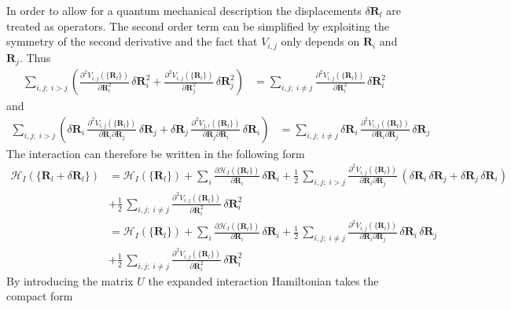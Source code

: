 In order to allow for a quantum mechanical description the displacements $\delta\mathbf{R}_l$ are treated as operators. The second order term can be simplified by exploiting the symmetry of the second derivative and the fact that $V_{i,j}$ only depends on $\mathbf{R}_i$ and $\mathbf{R}_j$. Thus
\begin{align*}
   \sum_{i,j;\;i> j}\left(\frac{\partial^2 V_{i,j}(\{\mathbf{R}_l\})}{\partial \mathbf{R}_i^2}\,\delta\mathbf{R}_i^2+\frac{\partial^2 V_{i,j}(\{\mathbf{R}_l\})}{\partial \mathbf{R}_j^2}\,\delta\mathbf{R}_j^2\right)&=\sum_{i,j;\;i\neq j}\frac{\partial^2 V_{i,j}(\{\mathbf{R}_l\})}{\partial \mathbf{R}_i^2}\,\delta\mathbf{R}_i^2
\end{align*}
and
\begin{align*}
    \sum_{i,j;\;i> j}\left(\delta\mathbf{R}_i\,\frac{\partial^2 V_{i,j}(\{\mathbf{R}_l\})}{\partial \mathbf{R}_i\partial\mathbf{R}_j}\,\delta\mathbf{R}_j + \delta\mathbf{R}_j\,\frac{\partial^2 V_{j,i}(\{\mathbf{R}_l\})}{\partial \mathbf{R}_j\partial\mathbf{R}_i}\,\delta\mathbf{R}_i\right)&= \sum_{i,j;\;i\neq j}\delta\mathbf{R}_i\,\frac{\partial^2 V_{i,j}(\{\mathbf{R}_l\})}{\partial \mathbf{R}_i\partial\mathbf{R}_j}\,\delta\mathbf{R}_j
\end{align*}
The interaction can therefore be written in the following form
\begin{align*}
    \mathcal{H}_I(\{\mathbf{R}_l+\delta\mathbf{R}_l\})&=\mathcal{H}_I(\{\mathbf{R}_l\})+\sum_i\frac{\partial \mathcal{H}_I(\{\mathbf{R}_l\})}{\partial \mathbf{R}_i}\,\delta\mathbf{R}_i + \frac12\, \sum_{i,j;\;i> j}\frac{\partial^2 V_{i,j}(\{\mathbf{R}_l\})}{\partial \mathbf{R}_i\partial\mathbf{R}_j}\, \left(\delta\mathbf{R}_i\,\delta\mathbf{R}_j+\delta\mathbf{R}_j\,\delta\mathbf{R}_i\right) \\
    &+\frac12\,\sum_{i,j;\;i\neq j}\frac{\partial^2 V_{i,j}(\{\mathbf{R}_l\})}{\partial \mathbf{R}_i^2}\,\delta\mathbf{R}_i^2\\
    &=\mathcal{H}_I(\{\mathbf{R}_l\})+\sum_i\frac{\partial \mathcal{H}_I(\{\mathbf{R}_l\})}{\partial \mathbf{R}_i}\,\delta\mathbf{R}_i + \frac12\, \sum_{i,j;\;i\neq j}\frac{\partial^2 V_{i,j}(\{\mathbf{R}_l\})}{\partial \mathbf{R}_i\partial\mathbf{R}_j}\,\delta\mathbf{R}_i\,\delta\mathbf{R}_j \\
    &+\frac12\,\sum_{i,j;\;i\neq j}\frac{\partial^2 V_{i,j}(\{\mathbf{R}_l\})}{\partial \mathbf{R}_i^2}\,\delta\mathbf{R}_i^2
\end{align*}
By introducing the matrix $U$ the expanded interaction Hamiltonian takes the compact form
